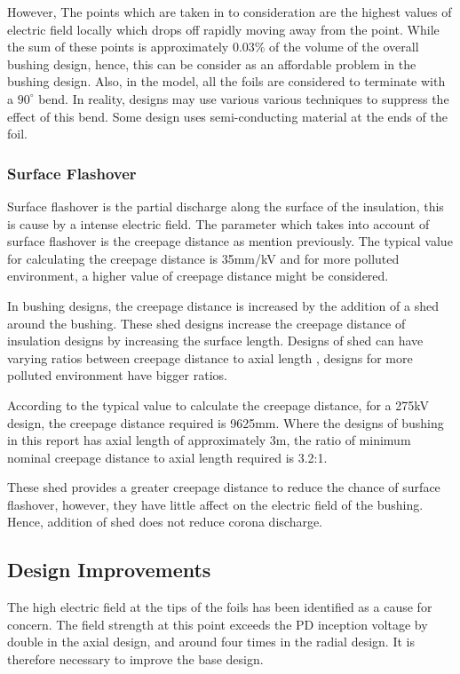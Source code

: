 However, The points which are taken in to consideration are the highest values of electric field locally which drops off rapidly moving away from the point. While the sum of these points is approximately 0.03\% of the volume of the overall bushing design, hence, this can be consider as an affordable problem in the bushing design. Also, in the model, all the foils are considered to terminate with a $90^\circ$ bend. In reality, designs may use various various techniques to suppress the effect of this bend. Some design uses semi-conducting material at the ends of the foil. %

\subsubsection{Surface Flashover}
Surface flashover is the partial discharge along the surface of the insulation, this is cause by a intense electric field. The parameter which takes into account of surface flashover is the creepage distance as mention previously. The typical value for calculating the creepage distance is 35mm/kV %
and for more polluted environment, a higher value of creepage distance might be considered.

In bushing designs, the creepage distance is increased by the addition of a shed around the bushing. These shed designs increase the creepage distance of insulation designs by increasing the surface length.  Designs of shed can have varying ratios between creepage distance to axial length \cite{shed}, designs for more polluted environment have bigger ratios.

According to the typical value to calculate the creepage distance, for a 275kV design, the creepage distance required is 9625mm. Where the designs of bushing in this report has axial length of approximately 3m, the ratio of minimum nominal creepage distance to axial length required is 3.2:1.

These shed provides a greater creepage distance to reduce the chance of surface flashover, however, they have little affect on the electric field of the bushing. Hence, addition of shed does not reduce corona discharge. 

\subsection{Design Improvements}
The high electric field at the tips of the foils has been identified as a cause for concern.
The field strength at this point exceeds the PD inception voltage by double in the axial design, and around four times in the radial design.
It is therefore necessary to improve the base design.

